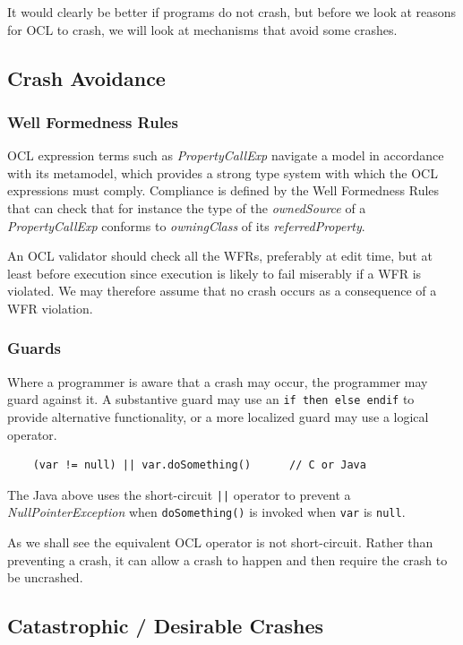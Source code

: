 \documentclass{llncs}
\begin{document}
It would clearly be better if programs do not crash, but before we look at reasons for OCL to crash, we will look at mechanisms that avoid some crashes.

\subsection{Crash Avoidance}

\subsubsection{Well Formedness Rules} OCL expression terms such as \emph{PropertyCallExp} navigate a model in accordance with its metamodel, which provides a strong type system with which the OCL expressions must comply. Compliance is defined by the Well Formedness Rules that can check that for instance the type of the \emph{ownedSource} of a \emph{PropertyCallExp} conforms to \emph{owningClass} of its \emph{referredProperty}.

An OCL validator should check all the WFRs, preferably at edit time, but at least before execution since execution is likely to fail miserably if a WFR is violated. We may therefore assume that no crash occurs as a consequence of a WFR violation.

\subsubsection{Guards}\label{Guards} Where a programmer is aware that a crash may occur, the programmer may guard against it. A substantive guard may use an \verb|if then else endif| to provide alternative functionality, or a more localized guard may use a logical operator.

\begin{verbatim}
    (var != null) || var.doSomething()		// C or Java
\end{verbatim}

The Java above uses the short-circuit \verb&||& operator to prevent a \emph{NullPointerException} when \verb|doSomething()| is invoked when \verb|var| is \verb|null|.

As we shall see the equivalent OCL operator is not short-circuit. Rather than preventing a crash, it can allow a crash to happen and then require the crash to be uncrashed.

\subsection{Catastrophic / Desirable Crashes}
\end{document}
